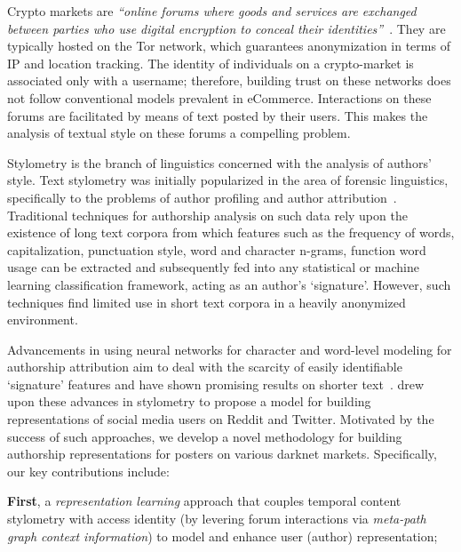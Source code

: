 \label{sec:sysml:intro}
Crypto markets are \textit{``online forums where goods and services are exchanged between parties who use digital encryption to conceal their identities''}~\citep{martin2014drugs}. 
  They are typically hosted on the Tor network, which guarantees  anonymization in terms of IP and location tracking. 
  The identity of individuals on a crypto-market is associated only with a username; therefore, building trust on these networks does not follow conventional models prevalent in eCommerce. 
  Interactions on these forums are facilitated by means of text posted by their users. 
  This makes the analysis of textual style on these forums a compelling problem.
  
  Stylometry is the branch of linguistics concerned with the analysis of authors' style.
  Text stylometry was initially popularized in the area of forensic linguistics, specifically to the problems of author profiling and author attribution~\citep{juola2008authorship,rangel2013overview}.
  Traditional techniques for authorship analysis on such data rely upon the existence of long text corpora from which features such as the frequency of words, capitalization, punctuation style, word and character n-grams, function word usage can be extracted and subsequently fed into any statistical or machine learning classification framework, acting as an author's `signature'. 
  However, such techniques find limited use in short text corpora in a heavily anonymized environment.
 
  
  Advancements in using neural networks for character and word-level modeling for authorship attribution aim to deal with the scarcity of easily identifiable `signature' features and have shown promising results on shorter text~\citep{shrestha2017convolutional}. 
  \citet{andrews2019learning} drew upon these advances in stylometry to propose a model for building representations of social media users on Reddit and Twitter. Motivated by the success of such approaches, we develop a novel methodology for building authorship representations for posters on various darknet markets. 
  Specifically, our key contributions include: 
  
  \noindent \textbf{First}, a {\it representation learning} approach that couples temporal content stylometry with access identity (by levering forum interactions via \textit{meta-path graph context information}) to model and enhance user (author) representation; 

